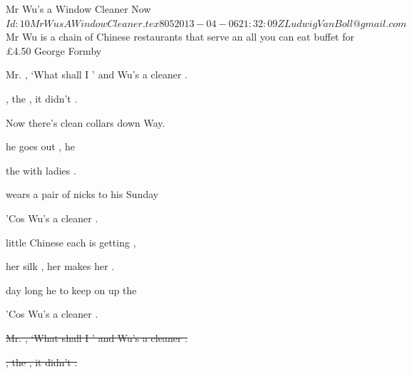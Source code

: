 \begin{SBSong}{Mr Wu's a Window Cleaner Now}
  {$Id: 10MrWusAWindowCleaner.tex 805 2013-04-06 21:32:09Z LudwigVanBoll@gmail.com $}
  {Mr Wu is a chain of Chinese restaurants that serve an all you can eat buffet for \pounds 4.50}
  {George Formby}
  \begin{SBChorus}
	 Mr. , `What shall I ' and  Wu's a  cleaner .
	
	, the , it didn't .
	
	Now there's  clean collars down  Way.
  \end{SBChorus}
  \begin{SBVerse}
	 he goes out ,  he 
	
	 the  with  ladies .
	
	 wears a pair of  nicks to  his Sunday 
	
	'Cos  Wu's a  cleaner .
  \end{SBVerse}
  \begin{SBVerse}
	 little Chinese  each  is getting ,
	
	 her silk , her  makes her .
	
	 day long he  to keep on  up the 
	
	'Cos  Wu's a  cleaner .
  \end{SBVerse}
  \begin{SBChorus}
	\sout{ Mr. , `What shall I ' and  Wu's a  cleaner .}
	
	\sout{, the , it didn't .}
	

\end{SBChorus}
\end{SBSong}
